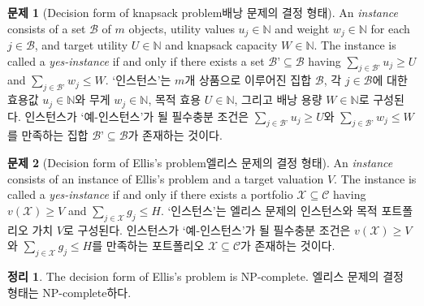 \documentclass[11pt]{article} %
\newtheorem{theorem}{Theorem}
\theoremstyle{definition}
\newtheorem{problem}{Problem}
\newtheorem{theorem}{정리}
\theoremstyle{definition}
\newtheorem{problem}{문제}
\begin{document}
\begin{problem}[\ifen Decision form of knapsack problem\else 배낭 문제의 결정 형태\fi]
\ifen 
An \emph{instance} consists of a set $\mathcal{B}$ of $m$ objects, utility values $u_j \in \mathbb{N}$ and weight $w_j \in \mathbb{N}$ for each $j \in \mathcal{B}$, and target utility $U\in \mathbb{N}$ and knapsack capacity $W\in \mathbb{N}$. The instance is called a \emph{yes-instance} if and only if there exists a set $\mathcal{B’} \subseteq \mathcal{B}$ having $\sum_{j \in \mathcal{B’}} u_j \geq U$ and  $\sum_{j \in \mathcal{B’}} w_j \leq W$.
\else
`인스턴스'는 $m$개 상품으로 이루어진 집합 $\mathcal{B}$, 각 $j \in \mathcal{B}$에 대한 효용값 $u_j \in \mathbb{N}$와 무게 $w_j \in \mathbb{N}$, 목적 효용 $U\in \mathbb{N}$, 그리고 배낭 용량 $W\in \mathbb{N}$로 구성된다. 인스턴스가 `예-인스턴스'가 될 필수충분 조건은 $\sum_{j \in \mathcal{B’}} u_j \geq U$와  $\sum_{j \in \mathcal{B’}} w_j \leq W$를 만족하는 집합 $\mathcal{B’} \subseteq \mathcal{B}$가 존재하는 것이다.
\fi
\end{problem}

\begin{problem}[\ifen Decision form of Ellis's problem\else 엘리스 문제의 결정 형태\fi] \label{ellisdecisionform}
\ifen
An \emph{instance} consists of an instance of Ellis’s problem and a target valuation $V$. The instance is called a \emph{yes-instance} if and only if there exists a portfolio $\mathcal{X} \subseteq \mathcal{C}$ having $v(\mathcal{X}) \geq V$ and  $\sum_{j \in \mathcal{X}} g_j \leq H$.
\else
`인스턴스'는 엘리스 문제의 인스턴스와 목적 포트폴리오 가치 $V$로 구성된다. 인스턴스가 `예-인스턴스'가 될 필수충분 조건은 $v(\mathcal{X}) \geq V$와 $\sum_{j \in \mathcal{X}} g_j \leq H$를 만족하는 포트폴리오 $\mathcal{X} \subseteq \mathcal{C}$가 존재하는 것이다.
\fi
\end{problem}

\begin{theorem}
\ifen
The decision form of Ellis’s problem is NP-complete.
\else
엘리스 문제의 결정 형태는 NP-complete하다.
\fi
\end{theorem}
\end{document}
